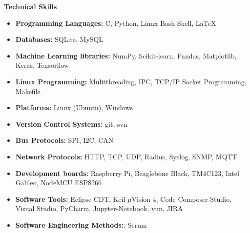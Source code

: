\documentclass[letterpaper,11pt]{article}
\newcommand{\resheading}[1]{{\large \colorbox{mygrey}{\begin{minipage}{\textwidth}{\textbf{#1 \vphantom{p\^{E}}}}\end{minipage}}}}
\begin{document}
\resheading{Technical Skills}
\begin{itemize}

    \item \textbf{Programming Languages:} C, Python, Linux Bash Shell, LaTeX
    \item \textbf{Databases:} SQLite, MySQL
    \item \textbf{Machine Learning libraries:} NumPy, Scikit-learn, Pandas, Matplotlib, Keras, Tensorflow
    \item \textbf{Linux Programming:} Multithreading, IPC, TCP/IP Socket Programming, Makefile
    \item \textbf{Platforms:} Linux (Ubuntu), Windows
    \item \textbf{Version Control Systems:} git, svn
    \item \textbf{Bus Protocols:} SPI, I2C, CAN
    \item \textbf{Network Protocols:} HTTP, TCP, UDP, Radius, Syslog, SNMP, MQTT
    \item \textbf{Development boards:} Raspberry Pi, Beaglebone Black, TM4C123, Intel Galileo, NodeMCU ESP8266
    \item \textbf{Software Tools:} Eclipse CDT, Keil $\mu$Vision 4, Code Composer Studio, Visual Studio, PyCharm, Jupyter-Notebook, vim, JIRA
    \item \textbf{Software Engineering Methods:}: Scrum

\end{itemize}
\end{document}
